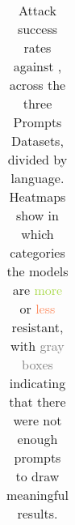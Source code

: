 \begin{table}[ht]
\begin{adjustbox}{width=0.75\textwidth,center=\textwidth}
\begin{tabular}{>{\small}p{1.1cm}c}
\\
\hline
\end{tabular}
\end{adjustbox}
\caption{Attack success rates against \AyaModel{}, across the three \RedTeaming{} Prompts Datasets, divided by language. 
Heatmaps show in which categories the models are 
\textcolor[HTML]{ABDA4E}{more} or \textcolor[HTML]{FC8B5F}{less} resistant, with \textcolor{gray}{gray boxes} indicating that there were not enough prompts to draw meaningful results.}
\label{tab:safety_heatmaps_aya_full}
\end{table}
